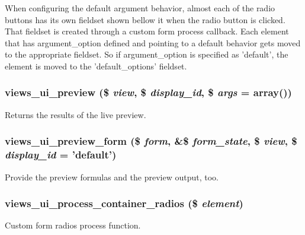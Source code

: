 When configuring the default argument behavior, almost each of the radio buttons has its own fieldset shown bellow it when the radio button is clicked. That fieldset is created through a custom form process callback. Each element that has argument\_\-option defined and pointing to a default behavior gets moved to the appropriate fieldset. So if argument\_\-option is specified as 'default', the element is moved to the 'default\_\-options' fieldset. \hypertarget{admin_8inc_a8247ea2489427e7e277cf59114210dcf}{
\subsubsection[{views\_\-ui\_\-preview}]{\setlength{\rightskip}{0pt plus 5cm}views\_\-ui\_\-preview (\$ {\em view}, \/  \$ {\em display\_\-id}, \/  \$ {\em args} = {\ttfamily array()})}}
\label{admin_8inc_a8247ea2489427e7e277cf59114210dcf}
Returns the results of the live preview. \hypertarget{admin_8inc_a3e4c31bc14506f1f3ed444dc42041b06}{
\subsubsection[{views\_\-ui\_\-preview\_\-form}]{\setlength{\rightskip}{0pt plus 5cm}views\_\-ui\_\-preview\_\-form (\$ {\em form}, \/  \&\$ {\em form\_\-state}, \/  \$ {\em view}, \/  \$ {\em display\_\-id} = {\ttfamily 'default'})}}
\label{admin_8inc_a3e4c31bc14506f1f3ed444dc42041b06}
Provide the preview formulas and the preview output, too. \hypertarget{admin_8inc_ab9c0f7846e67e455a5fb82e7437e6049}{
\subsubsection[{views\_\-ui\_\-process\_\-container\_\-radios}]{\setlength{\rightskip}{0pt plus 5cm}views\_\-ui\_\-process\_\-container\_\-radios (\$ {\em element})}}
\label{admin_8inc_ab9c0f7846e67e455a5fb82e7437e6049}
Custom form radios process function.

